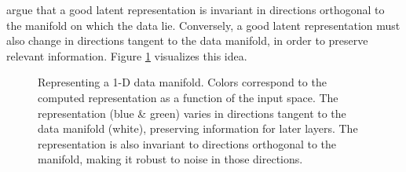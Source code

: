 \cite{rifai2011higher} argue that a good latent representation is invariant in directions orthogonal to the manifold on which the data lie.  Conversely, a good latent representation must also change in directions tangent to the data manifold, in order to preserve relevant information.  Figure \ref{fig:hidden} visualizes this idea.
%
\begin{figure}[t]
\centering
\caption[Desirable properties of representations of manifolds]
{Representing a 1-D data manifold.
Colors correspond to the computed representation as a function of the input space.
The representation (blue \& green) varies in directions tangent to the data manifold (white), preserving information for later layers. 
The representation is also invariant to directions orthogonal to the manifold, making it robust to noise in those directions.
}
\label{fig:hidden}
\end{figure}
